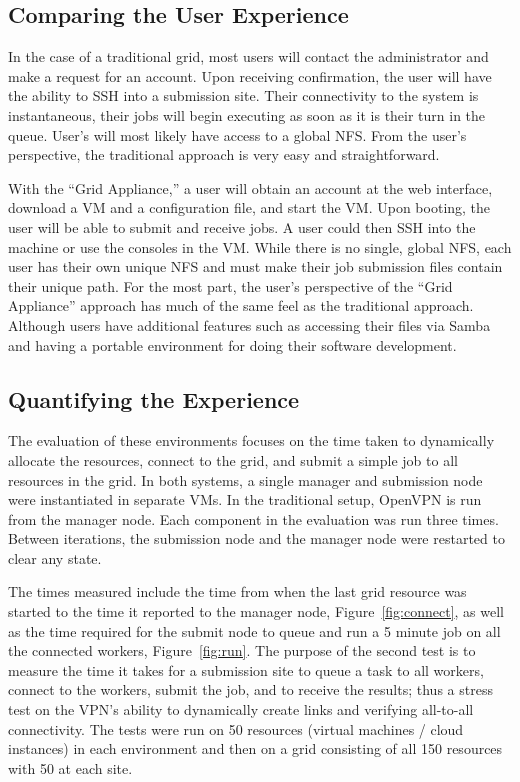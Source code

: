 \documentclass[conference]{IEEEtran}
\begin{document}
\subsection{Comparing the User Experience}

In the case of a traditional grid, most users will contact the administrator
and make a request for an account.  Upon receiving confirmation, the user will
have the ability to SSH into a submission site.  Their connectivity to the
system is instantaneous, their jobs will begin executing as soon as it is their
turn in the queue.  User's will most likely have access to a global NFS.  From
the user's perspective, the traditional approach is very easy and
straightforward.

With the ``Grid Appliance,'' a user will obtain an account at the web
interface, download a VM and a configuration file, and start the VM.  Upon
booting, the user will be able to submit and receive jobs.  A user could then
SSH into the machine or use the consoles in the VM.  While there is no single,
global NFS, each user has their own unique NFS and must make their job
submission files contain their unique path.  For the most part, the user's
perspective of the ``Grid Appliance'' approach has much of the same feel as the
traditional approach.  Although users have additional features such as
accessing their files via Samba and having a portable environment for doing
their software development.

\subsection{Quantifying the Experience}

The evaluation of these environments focuses on the time taken to dynamically
allocate the resources, connect to the grid, and submit a simple job to all
resources in the grid.  In both systems, a single manager and submission node
were instantiated in separate VMs.  In the traditional setup, OpenVPN is run
from the manager node.  Each component in the evaluation was run three times.
Between iterations, the submission node and the manager node were restarted to
clear any state.

The times measured include the time from when the last grid resource was
started to the time it reported to the manager node, Figure~\ref{fig:connect},
as well as the time required for the submit node to queue and run a 5 minute
job on all the connected workers, Figure~\ref{fig:run}.  The purpose of the
second test is to measure the time it takes for a submission site to queue a
task to all workers, connect to the workers, submit the job, and to receive the
results; thus a stress test on the VPN's ability to dynamically create links
and verifying all-to-all connectivity.  The tests were run on 50 resources
(virtual machines / cloud instances) in each environment and then on a grid
consisting of all 150 resources with 50 at each site.
\end{document}
